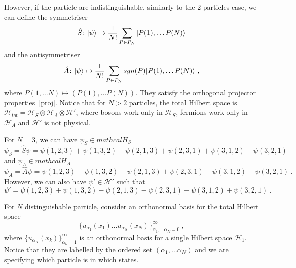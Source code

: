     However, if the particle are indistinguishable, similarly to the $2$ particles case, we can define the symmetriser
    \begin{equation*}
        \hat S \colon \vert\psi\rangle \mapsto \frac{1}{N!} \sum_{P \in P_N} \vert P(1), \ldots P(N)\rangle
    \end{equation*}
    and the antisymmetriser
    \begin{equation*}
        \hat A \colon \vert\psi\rangle \mapsto \frac{1}{N!} \sum_{P \in P_N} sgn(P) \vert P(1), \ldots P(N)\rangle ~,
    \end{equation*}
    where $P(1, \ldots N) \mapsto (P(1), \ldots P(N))$. 
    They satisfy the orthogonal projector properties~\eqref{proj}. Notice that for $N > 2$ particles, the total Hilbert space is $\mathcal H_{tot} = \mathcal H_S \otimes \mathcal H_A \otimes \mathcal H'$, where bosons work only in $\mathcal H_S$, fermions work only in $\mathcal H_A$ and $\mathcal H'$ is not physical.

    \begin{example}
        For $N=3$, we can have $\psi_S \in mathcal H_S$
        \begin{equation*}
            \psi_S = \hat S \psi = \psi(1,2,3) + \psi(1,3,2) + \psi(2,1,3) + \psi(2,3,1) + \psi(3,1,2) + \psi(3,2,1)
        \end{equation*}
        and $\psi_A \in mathcal H_A$
        \begin{equation*}
            \psi_A = \hat A \psi = \psi(1,2,3) - \psi(1,3,2) - \psi(2,1,3) + \psi(2,3,1) + \psi(3,1,2) - \psi(3,2,1) ~.
        \end{equation*}
        However, we can also have $\psi' \in \mathcal H'$ such that
        \begin{equation*}
            \psi' = \psi(1,2,3) + \psi(1,3,2) -  \psi(2,1,3) - \psi(2,3,1) + \psi(3,1,2) + \psi(3,2,1) ~.
        \end{equation*}
    \end{example}
    
    For $N$ distinguishable particle, consider an orthonormal basis for the total Hilbert space
    \begin{equation*}
        \{u_{\alpha_1}(x_1) \ldots u_{\alpha_N}(x_N)\}_{\alpha_1, \ldots \alpha_N=0}^\infty ~,
    \end{equation*}
    where $\{u_{\alpha_K} (x_k)\}_{\alpha_k = 1}^\infty$ is an orthonormal basis for a single Hilbert space $\mathcal H_1$. Notice that they are labelled by the ordered set $(\alpha_1, \ldots \alpha_N)$ and we are specifying which particle is in which states. 

